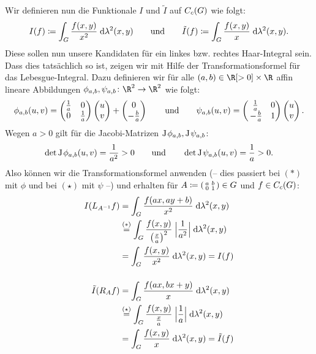 \begin{BspList}[\label{tg:haarbsp}]
    Wir definieren nun die Funktionale $I$ und $\tilde I$ auf $C_c(G)$ wie folgt:
    \[  I(f) \coloneqq \int_G \frac{f(x,y)}{x^2} \;\mathrm{d} \lambda^2(x,y) 
        \qquad\text{und}\qquad
        \tilde I(f) \coloneqq \int_G \frac{f(x,y)}{x}   \;\mathrm{d} \lambda^2(x,y)
    . \]
    Diese sollen nun unsere Kandidaten für ein linkes bzw. rechtes Haar-Integral
    sein. Dass dies tatsächlich so ist, zeigen wir mit Hilfe der
    Transformationsformel für das Lebesgue-Integral. Dazu definieren wir für
    alle $(a,b)\in\R[>0]\times\R$ affin lineare Abbildungen 
    $\phi_{a,b},\psi_{a,b}\colon \R^2\to\R^2$ wie folgt:
    \[ 
        \phi_{a,b}(u,v) 
        = \begin{pmatrix}  \frac{1}{a} & 0 \\ 0 & \frac{1}{a}  \end{pmatrix} \begin{pmatrix} u\\v \end{pmatrix} 
            + \begin{pmatrix} 0\\-\frac{b}{a} \end{pmatrix}
        \qquad\text{und}\qquad
        \psi_{a,b}(u,v)
        = \begin{pmatrix}  \frac{1}{a} & 0 \\ \,-\frac{b}{a} & 1  \end{pmatrix} \begin{pmatrix} u\\v \end{pmatrix}
    . \]
    Wegen $a>0$ gilt für die Jacobi-Matrizen $\operatorname{J\mkern-1mu}\phi_{a,b},\operatorname{J\mkern-1mu}\psi_{a,b}$:
    \[  \det\operatorname{J\mkern-1mu}\phi_{a,b}(u,v) = \frac{1}{a^2} > 0
        \qquad\text{und}\qquad
        \det\operatorname{J\mkern-1mu}\psi_{a,b}(u,v) = \frac{1}{a} > 0
    . \]
    Also können wir die Transformationsformel anwenden (-- dies passiert bei
    $(\ast)$ mit $\phi$ und bei $(\star)$ mit $\psi$ --) und erhalten für $A
    \coloneqq \begin{psmallmatrix}a & b \\ 0 & 1\end{psmallmatrix} \in G$
    und $f\in C_c(G)$:
    \begin{align*}
        I(L_{A^{-1}}f) 
        &= \int_G \frac{f(ax,ay+b)}{x^2} \dif{\lambda^2(x,y)}   \\
        &\overset{(\ast)}{=}                                    %
        \int_G \frac{f(x,y)}{\left(\frac{x}{a}\right)^2} \;     %
            \abs[\Big]{\frac{1}{a^2}}  \dif{\lambda^2(x,y)}     \\
        &= \int_G \frac{f(x,y)}{x^2} \dif{\lambda^2(x,y)} = I(f)
        \\[3ex]
        \tilde I(R_{A}f) 
        &= \int_G \frac{f(ax,bx+y)}{x} \dif{\lambda^2(x,y)}     \\
        &\overset{(\star)}{=}                                   %
        \int_G \frac{f(x,y)}{\frac{x}{a}} \;                    %
            \abs[\Big]{\frac{1}{a}}  \dif{\lambda^2(x,y)}       \\
        &= \int_G \frac{f(x,y)}{x} \dif{\lambda^2(x,y)} = \tilde I(f)

\end{align*}
\end{BspList}
